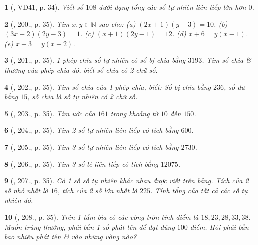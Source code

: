 \documentclass{article}
\newtheorem{baitoan}{}
\begin{document}
\begin{baitoan}[\cite{Binh_Toan_6_tap_1}, VD41, p. 34]
	Viết số $108$ dưới dạng tổng các số tự nhiên liên tiếp lớn hơn $0$.
\end{baitoan}

\begin{baitoan}[\cite{Binh_Toan_6_tap_1}, 200., p. 35]
	Tìm $x,y\in\mathbb{N}$ sao cho: (a) $(2x + 1)(y - 3) = 10$. (b) $(3x - 2)(2y - 3) = 1$. (c) $(x + 1)(2y - 1) = 12$. (d) $x + 6 = y(x - 1)$. (e) $x - 3 = y(x + 2)$.
\end{baitoan}

\begin{baitoan}[\cite{Binh_Toan_6_tap_1}, 201., p. 35]
	1 phép chia số tự nhiên có số bị chia bằng $3193$. Tìm số chia \& thương của phép chia đó, biết số chia có 2 chữ số.
\end{baitoan}

\begin{baitoan}[\cite{Binh_Toan_6_tap_1}, 202., p. 35]
	Tìm số chia của 1 phép chia, biết: Số bị chia bằng $236$, số dư bằng $15$, số chia là số tự nhiên có 2 chữ số.
\end{baitoan}	

\begin{baitoan}[\cite{Binh_Toan_6_tap_1}, 203., p. 35]
	Tìm ước của $161$ trong khoảng từ $10$ đến $150$.
\end{baitoan}

\begin{baitoan}[\cite{Binh_Toan_6_tap_1}, 204., p. 35]
	Tìm 2 số tự nhiên liên tiếp có tích bằng $600$.
\end{baitoan}

\begin{baitoan}[\cite{Binh_Toan_6_tap_1}, 205., p. 35]
	Tìm 3 số tự nhiên liên tiếp có tích bằng $2730$.
\end{baitoan}

\begin{baitoan}[\cite{Binh_Toan_6_tap_1}, 206., p. 35]
	Tìm 3 số lẻ liên tiếp có tích bằng $12075$.
\end{baitoan}

\begin{baitoan}[\cite{Binh_Toan_6_tap_1}, 207., p. 35]
	Có 1 số số tự nhiên khác nhau được viết trên bảng. Tích của 2 số nhỏ nhất là $16$, tích của 2 số lớn nhất là $225$. Tính tổng của tất cả các số tự nhiên đó.
\end{baitoan}

\begin{baitoan}[\cite{Binh_Toan_6_tap_1}, 208., p. 35]
	Trên 1 tấm bia có các vòng tròn tính điểm là $18,23,28,33,38$. Muốn trúng thưởng, phải bắn 1 số phát tên để đạt đúng $100$ điểm. Hỏi phải bắn bao nhiêu phát tên \& vào những vòng nào?
\end{baitoan}
\end{document}
